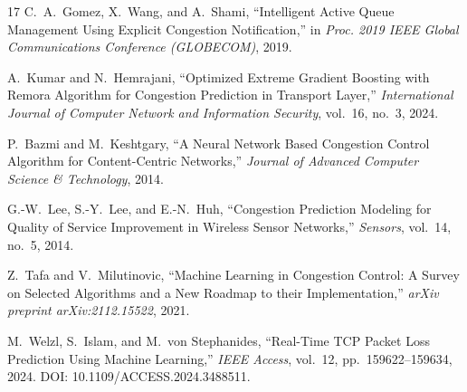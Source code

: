 \documentclass[journal]{IEEEtran}
\begin{document}
\begin{thebibliography}{17}
C.~A.~Gomez, X.~Wang, and A.~Shami, ``Intelligent Active Queue Management Using Explicit Congestion Notification,'' in \textit{Proc. 2019 IEEE Global Communications Conference (GLOBECOM)}, 2019.

A.~Kumar and N.~Hemrajani, ``Optimized Extreme Gradient Boosting with Remora Algorithm for Congestion Prediction in Transport Layer,'' \textit{International Journal of Computer Network and Information Security}, vol.~16, no.~3, 2024.

P.~Bazmi and M.~Keshtgary, ``A Neural Network Based Congestion Control Algorithm for Content-Centric Networks,'' \textit{Journal of Advanced Computer Science \& Technology}, 2014.

G.-W.~Lee, S.-Y.~Lee, and E.-N.~Huh, ``Congestion Prediction Modeling for Quality of Service Improvement in Wireless Sensor Networks,'' \textit{Sensors}, vol.~14, no.~5, 2014.

Z.~Tafa and V.~Milutinovic, ``Machine Learning in Congestion Control: A Survey on Selected Algorithms and a New Roadmap to their Implementation,'' \textit{arXiv preprint arXiv:2112.15522}, 2021.

M.~Welzl, S.~Islam, and M.~von Stephanides, ``Real-Time TCP Packet Loss Prediction Using Machine Learning,'' \textit{IEEE Access}, vol.~12, pp.~159622--159634, 2024. DOI: 10.1109/ACCESS.2024.3488511.

\end{thebibliography}
\end{document}
